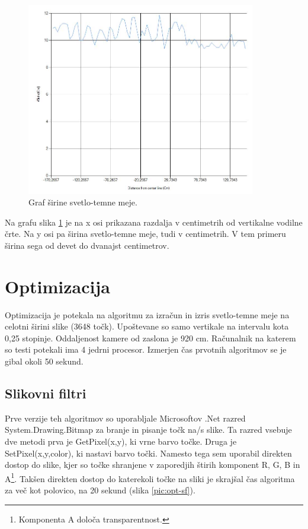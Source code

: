 \documentclass[oneside, a4paper, 12pt]{book}
\begin{document}
\begin{figure}
\begin{center}
\includegraphics[width=10cm]{slike/graf-sirina-s-t-meja.jpg}
\end{center}
\caption{Graf širine svetlo-temne meje.}
\label{pic:st-sirina}
\end{figure}


Na grafu slika \ref{pic:st-sirina} je na x osi prikazana razdalja v centimetrih od vertikalne vodilne črte. Na y osi pa širina svetlo-temne meje, tudi v centimetrih. V tem primeru širina sega od devet do dvanajst centimetrov.


\section{Optimizacija}
Optimizacija je potekala na algoritmu za izračun in izris svetlo-temne meje na celotni širini slike (3648 točk). Upoštevane so samo vertikale na intervalu kota 0,25 stopinje. Oddaljenost kamere od zaslona je 920 cm. Računalnik na katerem so testi potekali ima 4 jedrni procesor. Izmerjen čas prvotnih algoritmov se je gibal okoli 50 sekund.

\subsection{Slikovni filtri}
Prve verzije teh algoritmov so uporabljale Microsoftov .Net razred System.\-Drawing.\-Bitmap za branje in pisanje točk na/s slike. Ta razred vsebuje dve metodi prva je GetPixel(x,y), ki vrne barvo točke. Druga je SetPixel(x,y,color), ki nastavi barvo točki. Namesto tega sem uporabil direkten dostop do slike, kjer so točke shranjene v zaporedjih štirih komponent R, G, B in A\footnote{Komponenta A določa transparentnost.}. Takšen direkten dostop do katerekoli točke na sliki je skrajšal čas algoritma za več kot polovico, na 20 sekund (slika \ref{pic:opt-sf}).
\end{document}
